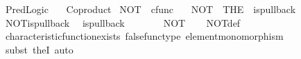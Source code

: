 %
\begin{isabellebody}%
%
%
\isadelimdocument
%
\endisadelimdocument
%
\isatagdocument
%
\isamarkuptrue%
%
\endisatagdocument
{\isafolddocument}%
%
\isadelimdocument
%
\endisadelimdocument
%
\isadelimtheory
%
\endisadelimtheory
%
\isatagtheory
{}\isamarkupfalse%
\ Pred{\isacharunderscore}{\kern0pt}Logic\isanewline
\ \ \ Coproduct\isanewline
{}%
\endisatagtheory
{\isafoldtheory}%
%
\isadelimtheory
%
\endisadelimtheory
%
\isadelimdocument
%
\endisadelimdocument
%
\isatagdocument
%
\isamarkuptrue%
%
\endisatagdocument
{\isafolddocument}%
%
\isadelimdocument
%
\endisadelimdocument
{}\isamarkupfalse%
\ NOT\ {\isacharcolon}{\kern0pt}{\isacharcolon}{\kern0pt}\ {\isachardoublequoteopen}cfunc{\isachardoublequoteclose}\ \isanewline
\ \ {\isachardoublequoteopen}NOT\ {\isacharequal}{\kern0pt}\ {\isacharparenleft}{\kern0pt}THE\ {\isasymchi}{\isachardot}{\kern0pt}\ is{\isacharunderscore}{\kern0pt}pullback\ {\isasymone}\ {\isasymone}\ {\isasymOmega}\ {\isasymOmega}\ {\isacharparenleft}{\kern0pt}{\isasymbeta}\isactrlbsub {\isasymone}\isactrlesub {\isacharparenright}{\kern0pt}\ {\isasymt}\ {\isasymf}\ {\isasymchi}{\isacharparenright}{\kern0pt}{\isachardoublequoteclose}\isanewline
\isanewline
{}\isamarkupfalse%
\ NOT{\isacharunderscore}{\kern0pt}is{\isacharunderscore}{\kern0pt}pullback{\isacharcolon}{\kern0pt}\isanewline
\ \ {\isachardoublequoteopen}is{\isacharunderscore}{\kern0pt}pullback\ {\isasymone}\ {\isasymone}\ {\isasymOmega}\ {\isasymOmega}\ {\isacharparenleft}{\kern0pt}{\isasymbeta}\isactrlbsub {\isasymone}\isactrlesub {\isacharparenright}{\kern0pt}\ {\isasymt}\ {\isasymf}\ NOT{\isachardoublequoteclose}\isanewline
%
\isadelimproof
\ \ %
\endisadelimproof
%
\isatagproof
{}\isamarkupfalse%
\ NOT{\isacharunderscore}{\kern0pt}def\isanewline
\ \ \isamarkupfalse%
\ characteristic{\isacharunderscore}{\kern0pt}function{\isacharunderscore}{\kern0pt}exists\ false{\isacharunderscore}{\kern0pt}func{\isacharunderscore}{\kern0pt}type\ element{\isacharunderscore}{\kern0pt}monomorphism\isanewline
\ \ \isamarkupfalse%
\ {\isacharparenleft}{\kern0pt}subst\ the{}I{}{\isacharcomma}{\kern0pt}\ auto{\isacharparenright}{\kern0pt}%
\endisatagproof
{\isafoldproof}%
%
\isadelimproof
\isanewline
%
\endisadelimproof
\isanewline
{}\isamarkupfalse%

\end{isabellebody}
